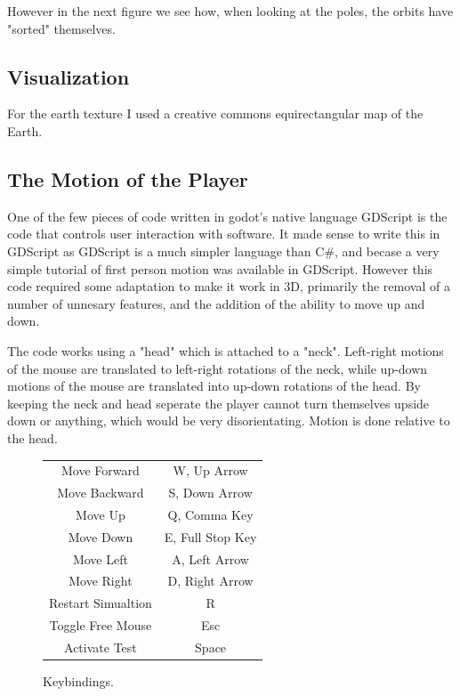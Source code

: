 \documentclass[12pt]{article}
\begin{document}
However in the next figure we see how, when looking at the poles, the orbits have "sorted" themselves.


\subsection{Visualization}

For the earth texture I used a creative commons equirectangular map of the Earth. \cite{Map}

\subsection{The Motion of the Player}

One of the few pieces of code written in godot's native language GDScript is the code that controls user interaction with software. It made sense to write this in GDScript as GDScript is a much simpler language than C\#, and becase a very simple tutorial of first person motion was available in GDScript\cite{FirstPersonMotion}. However this code required some adaptation to make it work in 3D, primarily the removal of a number of unnesary features, and the addition of the ability to move up and down.

The code works using a "head" which is attached to a "neck". Left-right motions of the mouse are translated to left-right rotations of the neck, while up-down motions of the mouse are translated into up-down rotations of the head. By keeping the neck and head seperate the player cannot turn themselves upside down or anything, which would be very disorientating. Motion is done relative to the head.

\begin{figure}
\begin{center}
\label{fig:Keybindings}
\caption{Keybindings.}
\begin{tabular}{ | c | c  | }
	\hline
	Move Forward & W, Up Arrow \\
	Move Backward & S, Down Arrow\\
	Move Up & Q, Comma Key\\
	Move Down & E, Full Stop Key\\
	Move Left & A, Left Arrow \\
	Move Right & D, Right Arrow \\
	Restart Simualtion & R \\
	Toggle Free Mouse & Esc \\
	Activate Test & Space \\
	\hline
\end{tabular}
\end{center}
\end{figure}
\end{document}
